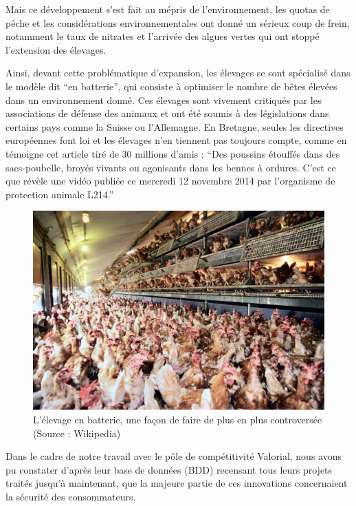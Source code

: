 \documentclass[a4paper,12pt]{report}
\begin{document}
			Mais ce développement s’est fait au mépris de l’environnement, les quotas de pêche et les considérations environnementales ont donné un sérieux coup de frein, notamment le taux de nitrates et l’arrivée des algues vertes qui ont stoppé l’extension des élevages.
			
			Ainsi, devant cette problématique d’expansion, les élevages se sont spécialisé dans le modèle dit “en batterie”, qui consiste à optimiser le nombre de bêtes élevées dans un environnement donné. Ces élevages sont vivement critiqués par les associations de défense des animaux  et ont été soumis à des législations dans certains pays comme la Suisse ou l’Allemagne. En Bretagne, seules les directives européennes font loi et les élevages n’en tiennent pas toujours compte, comme en témoigne cet article tiré de 30 millions d’amis\cite{BretagnePoussinsBroyesEtouffesDansCouvoir} : “Des poussins étouffés dans des sacs-poubelle, broyés vivants ou agonisants dans les bennes à ordures. C'est ce que révèle une vidéo publiée ce mercredi 12 novembre 2014 par l’organisme de protection animale L214.”
			
			\begin{figure}[!h]
			\centering
			\includegraphics[scale=0.75]{Illustrations/PouleBatterie.jpg}
			\caption{L'élevage en batterie, une façon de faire de plus en plus controversée\\(Source : Wikipedia)}
			\label{PouleBatterie}
			\end{figure}
			
			Dans le cadre de notre travail avec le pôle de compétitivité Valorial, nous avons pu constater d’après leur base de données (BDD) recensant tous leurs projets traités jusqu’à maintenant, que la majeure partie de ces innovations concernaient la sécurité des consommateurs. 
			
\end{document}
